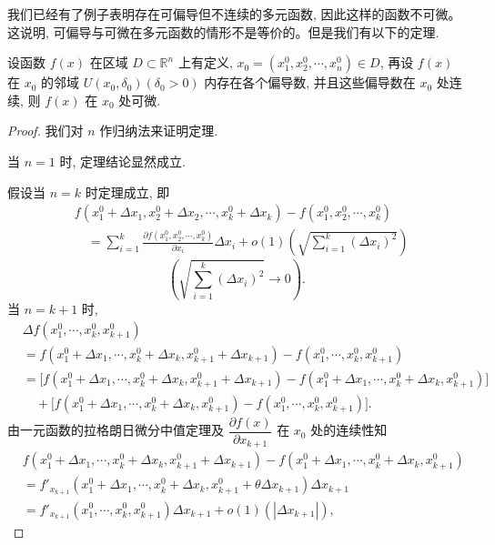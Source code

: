 我们已经有了例子表明存在可偏导但不连续的多元函数, 因此这样的函数不可微。这说明, 可偏导与可微在多元函数的情形不是等价的。但是我们有以下的定理.

\begin{theorem}\label{theorem:ma-14-1-2}
设函数 $f(x)$ 在区域 $D\subset\mathbb R^n$ 上有定义, $x_0=(x_1^0,x_2^0,\cdots,x_n^0)\in D$, 再设 $f(x)$ 在 $x_0$ 的邻域 $U(x_0,\delta_0)(\delta_0>0)$ 内存在各个偏导数, 并且这些偏导数在 $x_0$ 处连续, 则 $f(x)$ 在 $x_0$ 处可微.
\end{theorem}


\begin{proof}
我们对 $n$ 作归纳法来证明定理.

当 $n=1$ 时, 定理结论显然成立.

假设当 $n=k$ 时定理成立, 即
\[
\begin{aligned}
&f(x_1^0+\Delta x_1,x_2^0+\Delta x_2,\cdots,x_k^0+\Delta x_k)
  -f(x_1^0,x_2^0,\cdots,x_k^0)\\
&\quad =
  \sum_{i=1}^k
  \frac{\partial f(x_1^0,x_2^0,\cdots,x_k^0)}{\partial x_i}\Delta x_i
  +o(1)\left(\sqrt{\sum_{i=1}^k(\Delta x_i)^2}\right)
\end{aligned}
\]
\[
  \left(\sqrt{\sum_{i=1}^k(\Delta x_i)^2}\to0\right).
\]
当 $n=k+1$ 时,
\[
\begin{aligned}
&\Delta f(x_1^0,\cdots,x_k^0,x_{k+1}^0)\\
&=f(x_1^0+\Delta x_1,\cdots,x_k^0+\Delta x_k,x_{k+1}^0+\Delta x_{k+1})
  -f(x_1^0,\cdots,x_k^0,x_{k+1}^0)\\
&=\big[f(x_1^0+\Delta x_1,\cdots,x_k^0+\Delta x_k,x_{k+1}^0+\Delta x_{k+1})
  -f(x_1^0+\Delta x_1,\cdots,x_k^0+\Delta x_k,x_{k+1}^0)\big]\\
&\quad+\big[f(x_1^0+\Delta x_1,\cdots,x_k^0+\Delta x_k,x_{k+1}^0)
  -f(x_1^0,\cdots,x_k^0,x_{k+1}^0)\big].
\end{aligned}
\]
由一元函数的拉格朗日微分中值定理及 $\dfrac{\partial f(x)}{\partial x_{k+1}}$ 在 $x_0$ 处的连续性知
\begin{equation}
\begin{aligned}
&f(x_1^0+\Delta x_1,\cdots,x_k^0+\Delta x_k,x_{k+1}^0+\Delta x_{k+1})
  -f(x_1^0+\Delta x_1,\cdots,x_k^0+\Delta x_k,x_{k+1}^0)\\
&=f'_{x_{k+1}}(x_1^0+\Delta x_1,\cdots,x_k^0+\Delta x_k,
  x_{k+1}^0+\theta\Delta x_{k+1})\Delta x_{k+1}\\
&=f'_{x_{k+1}}(x_1^0,\cdots,x_k^0,x_{k+1}^0)\Delta x_{k+1}
  +o(1)(|\Delta x_{k+1}|),
\end{aligned}
\label{eq:ma-14-1-1}

\end{equation}
\end{proof}
